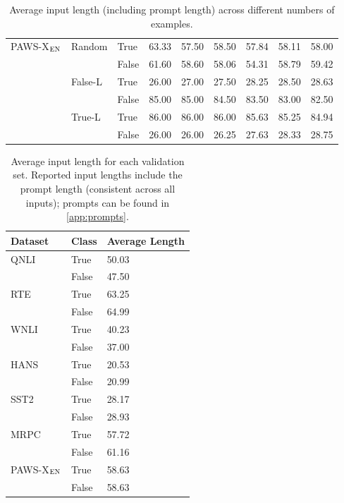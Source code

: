 \begin{table*}[h!]
\begin{tabular}{lllllllll}
  \midrule
  \multirow{6}{*}{PAWS-X$_{\textsc{EN}}$} & \multirow{2}{*}{Random} & True & 63.33 & 57.50 & 58.50 & 57.84 & 58.11 & 58.00 \\
  \cmidrule{3-9}
  & & False & 61.60 & 58.60 & 58.06 & 54.31 & 58.79 & 59.42 \\
  \cmidrule{2-9}
  & \multirow{2}{*}{False-L} & True & 26.00 & 27.00 & 27.50 & 28.25 & 28.50 & 28.63 \\
  \cmidrule{3-9}
  & & False & 85.00 & 85.00 & 84.50 & 83.50 & 83.00 &  82.50 \\
  \cmidrule{2-9}
  & \multirow{2}{*}{True-L} & True & 86.00 & 86.00 & 86.00 & 85.63 & 85.25 & 84.94 \\
  \cmidrule{3-9}
  & & False & 26.00 & 26.00 & 26.25 & 27.63 & 28.33 & 28.75 \\  
\bottomrule
\end{tabular}%
\caption{Average input length (including prompt length) across different numbers of examples. %
\label{table:avg_len_num_ex}}
\end{table*}

\begin{table*}[t]
\centering
\small
\begin{tabular}{lll}
  \toprule
  \textbf{Dataset} & \textbf{Class} & \textbf{Average Length}\\
  \midrule
  \multirow{2}{*}{QNLI} & True & 50.03 \\
  \cmidrule{2-3}
  & False & 47.50 \\
  \midrule
  \multirow{2}{*}{RTE} & True & 63.25 \\
  \cmidrule{2-3}
  & False & 64.99 \\
  \midrule
  \multirow{2}{*}{WNLI} & True & 40.23 \\
  \cmidrule{2-3}
  & False & 37.00 \\
  \midrule
  \multirow{2}{*}{HANS} & True & 20.53 \\
  \cmidrule{2-3}
  & False & 20.99 \\
  \midrule
  \multirow{2}{*}{SST2} & True & 28.17 \\
  \cmidrule{2-3}
  & False & 28.93 \\
  \midrule
  \multirow{2}{*}{MRPC} & True & 57.72 \\
  \cmidrule{2-3}
  & False & 61.16 \\
  \midrule
  \multirow{2}{*}{PAWS-X$_{\textsc{EN}}$} & True & 58.63 \\
  \cmidrule{2-3}
  & False & 58.63 \\
\bottomrule
\end{tabular}%
\caption{Average input length for each validation set. Reported input lengths include the prompt length (consistent across all inputs); prompts can be found in \autoref{app:prompts}. \label{table:avg_len_num_ex}}
\end{table*}